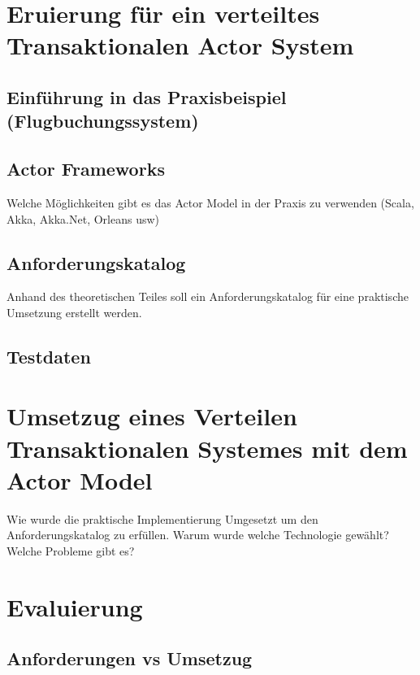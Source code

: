 
\chapter{Eruierung für ein verteiltes Transaktionalen Actor System }
\section{Einführung in das Praxisbeispiel (Flugbuchungssystem)}
\section{Actor Frameworks}\label{sec:ActorFrameworks}
Welche Möglichkeiten gibt es das Actor Model in der Praxis zu verwenden (Scala, Akka, Akka.Net, Orleans usw)

\section{Anforderungskatalog}
Anhand des theoretischen Teiles soll ein Anforderungskatalog für eine praktische Umsetzung erstellt werden.

\section{Testdaten}

\chapter{Umsetzug eines Verteilen Transaktionalen Systemes mit dem Actor Model}
Wie wurde die praktische Implementierung Umgesetzt um den Anforderungskatalog zu erfüllen. Warum wurde welche Technologie gewählt? Welche Probleme gibt es? 

\chapter{Evaluierung}
\section{Anforderungen vs Umsetzug}

